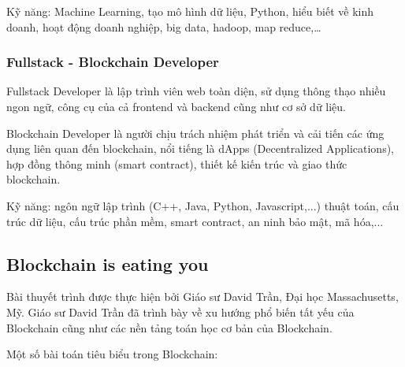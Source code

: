 \documentclass[14pt, a4paper]{article}
\numberwithin{equation}{section}
\numberwithin{figure}{section}
\numberwithin{dl}{section}
\numberwithin{md}{section}
\numberwithin{bd}{section}
\numberwithin{dn}{section}
\numberwithin{hq}{section}
\begin{document}
    Kỹ năng: Machine Learning, tạo mô hình dữ liệu, Python, hiểu biết về kinh doanh, hoạt động doanh nghiệp, big data, hadoop, map reduce,\dots

    \subsubsection{Fullstack - Blockchain Developer}

    Fullstack Developer là lập trình viên web toàn diện, sử dụng thông thạo nhiều ngon ngữ, công cụ của cả frontend và backend cũng như cơ sở dữ liệu.

    Blockchain Developer là người chịu trách nhiệm phát triển và cải tiến các ứng dụng liên quan đến blockchain, nổi tiếng là dApps (Decentralized Applications), hợp đồng thông minh (smart contract), thiết kế kiến trúc và giao thức blockchain.

    Kỹ năng: ngôn ngữ lập trình (C++, Java, Python, Javascript,...) thuật toán, cấu trúc dữ liệu, cấu trúc phần mềm, smart contract, an ninh bảo mật, mã hóa,...

    \subsection{Blockchain is eating you}

    Bài thuyết trình được thực hiện bởi Giáo sư David Trần, Đại học Massachusetts, Mỹ. 
    Giáo sư David Trần đã trình bày về xu hướng phổ biến tất yếu của Blockchain cũng như các nền tảng toán học cơ bản của Blockchain.

    Một số bài toán tiêu biểu trong Blockchain:
\end{document}
